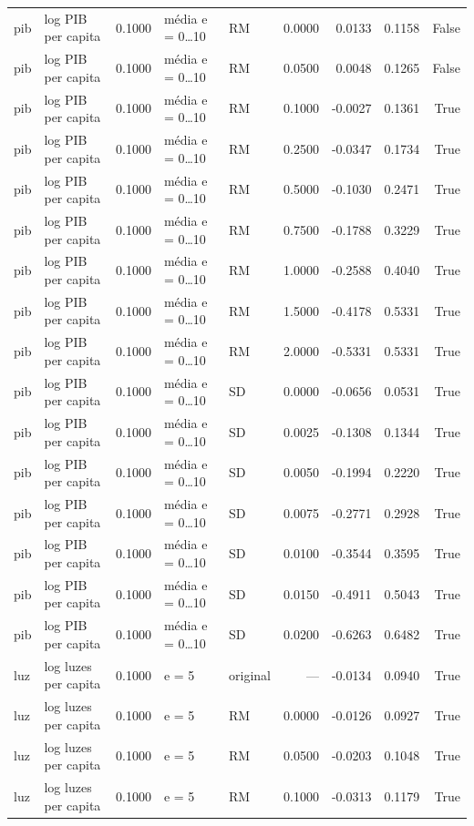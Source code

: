\begin{table}
{\begin{tabular}{llrllrrrr}
pib & log PIB per capita & 0.1000 & média e = 0…10 & RM & 0.0000 & 0.0133 & 0.1158 & False \\
pib & log PIB per capita & 0.1000 & média e = 0…10 & RM & 0.0500 & 0.0048 & 0.1265 & False \\
pib & log PIB per capita & 0.1000 & média e = 0…10 & RM & 0.1000 & -0.0027 & 0.1361 & True \\
pib & log PIB per capita & 0.1000 & média e = 0…10 & RM & 0.2500 & -0.0347 & 0.1734 & True \\
pib & log PIB per capita & 0.1000 & média e = 0…10 & RM & 0.5000 & -0.1030 & 0.2471 & True \\
pib & log PIB per capita & 0.1000 & média e = 0…10 & RM & 0.7500 & -0.1788 & 0.3229 & True \\
pib & log PIB per capita & 0.1000 & média e = 0…10 & RM & 1.0000 & -0.2588 & 0.4040 & True \\
pib & log PIB per capita & 0.1000 & média e = 0…10 & RM & 1.5000 & -0.4178 & 0.5331 & True \\
pib & log PIB per capita & 0.1000 & média e = 0…10 & RM & 2.0000 & -0.5331 & 0.5331 & True \\
pib & log PIB per capita & 0.1000 & média e = 0…10 & SD & 0.0000 & -0.0656 & 0.0531 & True \\
pib & log PIB per capita & 0.1000 & média e = 0…10 & SD & 0.0025 & -0.1308 & 0.1344 & True \\
pib & log PIB per capita & 0.1000 & média e = 0…10 & SD & 0.0050 & -0.1994 & 0.2220 & True \\
pib & log PIB per capita & 0.1000 & média e = 0…10 & SD & 0.0075 & -0.2771 & 0.2928 & True \\
pib & log PIB per capita & 0.1000 & média e = 0…10 & SD & 0.0100 & -0.3544 & 0.3595 & True \\
pib & log PIB per capita & 0.1000 & média e = 0…10 & SD & 0.0150 & -0.4911 & 0.5043 & True \\
pib & log PIB per capita & 0.1000 & média e = 0…10 & SD & 0.0200 & -0.6263 & 0.6482 & True \\
luz & log luzes per capita & 0.1000 & e = 5 & original & — & -0.0134 & 0.0940 & True \\
luz & log luzes per capita & 0.1000 & e = 5 & RM & 0.0000 & -0.0126 & 0.0927 & True \\
luz & log luzes per capita & 0.1000 & e = 5 & RM & 0.0500 & -0.0203 & 0.1048 & True \\
luz & log luzes per capita & 0.1000 & e = 5 & RM & 0.1000 & -0.0313 & 0.1179 & True \\

\end{tabular}}
\end{table}

